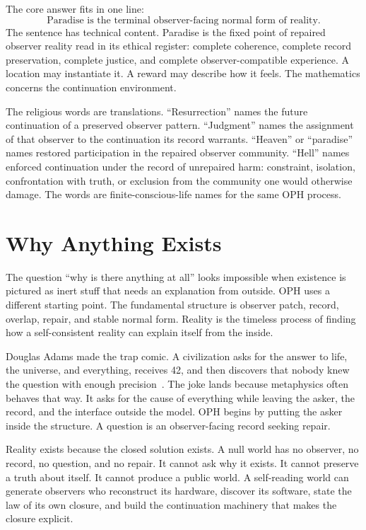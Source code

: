 \documentclass[11pt]{article}
\theoremstyle{remark}
\theoremstyle{plain}
\begin{document}
The core answer fits in one line:
\[
\boxed{
\text{Paradise is the terminal observer-facing normal form of reality.}
}
\]
The sentence has technical content. Paradise is the fixed point of repaired
observer reality read in its ethical register: complete coherence, complete
record preservation, complete justice, and complete observer-compatible
experience. A location may instantiate it. A reward may describe how it feels.
The mathematics concerns the continuation environment.

The religious words are translations. ``Resurrection'' names the
future continuation of a preserved observer pattern. ``Judgment'' names the
assignment of that observer to the continuation its record warrants. ``Heaven''
or ``paradise'' names restored participation in the repaired observer
community. ``Hell'' names enforced continuation under the record of unrepaired
harm: constraint, isolation, confrontation with truth, or exclusion from the
community one would otherwise damage. The words are finite-conscious-life names
for the same OPH process.

\section{Why Anything Exists}

The question ``why is there anything at all'' looks impossible when existence
is pictured as inert stuff that needs an explanation from outside. OPH uses a
different starting point. The fundamental structure is observer patch, record,
overlap, repair, and stable normal form. Reality is the timeless process of
finding how a self-consistent reality can explain itself from the inside.

Douglas Adams made the trap comic. A civilization asks for the answer to life,
the universe, and everything, receives 42, and then discovers that nobody knew
the question with enough precision~\cite{Adams1979}. The joke lands because
metaphysics often behaves that way. It asks for the cause of everything while
leaving the asker, the record, and the interface outside the model. OPH begins
by putting the asker inside the structure. A question is an observer-facing
record seeking repair.

Reality exists because the closed solution exists.
A null world has no observer, no record, no question, and no repair. It cannot
ask why it exists. It cannot preserve a truth about itself. It cannot produce a
public world. A self-reading world can generate observers who reconstruct its
hardware, discover its software, state the law of its own closure, and build the
continuation machinery that makes the closure explicit.
\end{document}
